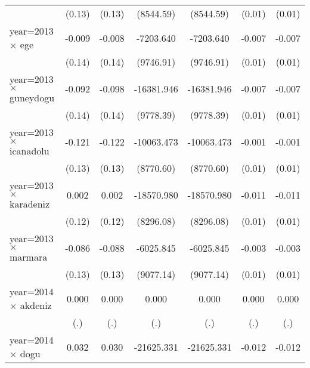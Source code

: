 {\begin{tabular}{l*{6}{c}}
                    &      (0.13)         &      (0.13)         &   (8544.59)         &   (8544.59)         &      (0.01)         &      (0.01)         \\
year=2013 $\times$ ege&      -0.009         &      -0.008         &   -7203.640         &   -7203.640         &      -0.007         &      -0.007         \\
                    &      (0.14)         &      (0.14)         &   (9746.91)         &   (9746.91)         &      (0.01)         &      (0.01)         \\
year=2013 $\times$ guneydogu&      -0.092         &      -0.098         &  -16381.946         &  -16381.946         &      -0.007         &      -0.007         \\
                    &      (0.14)         &      (0.14)         &   (9778.39)         &   (9778.39)         &      (0.01)         &      (0.01)         \\
year=2013 $\times$ icanadolu&      -0.121         &      -0.122         &  -10063.473         &  -10063.473         &      -0.001         &      -0.001         \\
                    &      (0.13)         &      (0.13)         &   (8770.60)         &   (8770.60)         &      (0.01)         &      (0.01)         \\
year=2013 $\times$ karadeniz&       0.002         &       0.002         &  -18570.980\sym{*}  &  -18570.980\sym{*}  &      -0.011         &      -0.011         \\
                    &      (0.12)         &      (0.12)         &   (8296.08)         &   (8296.08)         &      (0.01)         &      (0.01)         \\
year=2013 $\times$ marmara&      -0.086         &      -0.088         &   -6025.845         &   -6025.845         &      -0.003         &      -0.003         \\
                    &      (0.13)         &      (0.13)         &   (9077.14)         &   (9077.14)         &      (0.01)         &      (0.01)         \\
year=2014 $\times$ akdeniz&       0.000         &       0.000         &       0.000         &       0.000         &       0.000         &       0.000         \\
                    &         (.)         &         (.)         &         (.)         &         (.)         &         (.)         &         (.)         \\
year=2014 $\times$ dogu&       0.032         &       0.030         &  -21625.331\sym{*}  &  -21625.331\sym{*}  &      -0.012         &      -0.012         \\

\end{tabular}}
